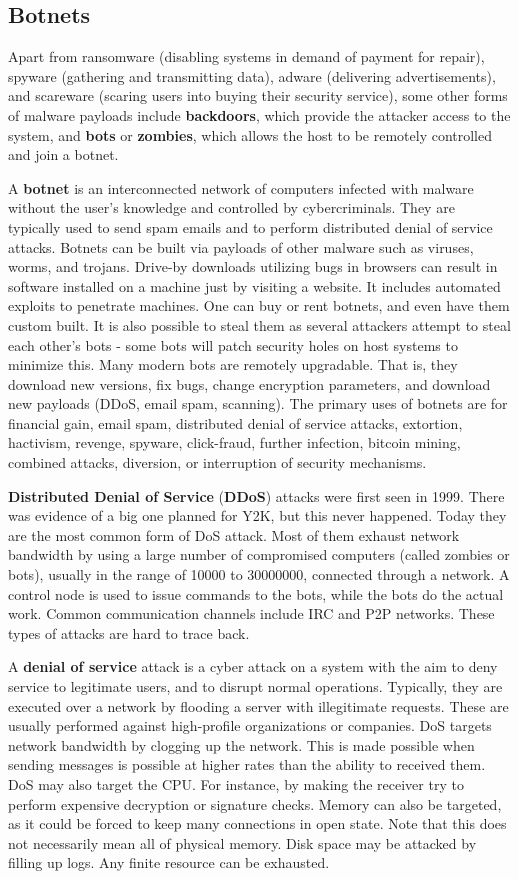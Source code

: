 \documentclass[11pt]{article}
\theoremstyle{plain} %
\theoremstyle{definition}
\theoremstyle{example}
\theoremstyle{remark}
\begin{document}
\subsection{Botnets}
Apart from ransomware (disabling systems in demand of payment for repair), spyware (gathering and transmitting data), adware (delivering advertisements), and scareware (scaring users into buying their security service), some other forms of malware payloads include \textbf{backdoors}, which provide the attacker access to the system, and \textbf{bots} or \textbf{zombies}, which allows the host to be remotely controlled and join a botnet. 

A \textbf{botnet} is an interconnected network of computers infected with malware without the user's knowledge and controlled by cybercriminals. They are typically used to send spam emails and to perform distributed denial of service attacks. Botnets can be built via payloads of other malware such as viruses, worms, and trojans. Drive-by downloads utilizing bugs in browsers can result in software installed on a machine just by visiting a website. It includes automated exploits to penetrate machines. One can buy or rent botnets, and even have them custom built. It is also possible to steal them as several attackers attempt to steal each other's bots - some bots will patch security holes on host systems to minimize this. Many modern bots are remotely upgradable. That is, they download new versions, fix bugs, change encryption parameters, and download new payloads (DDoS, email spam, scanning). The primary uses of botnets are for financial gain, email spam, distributed denial of service attacks, extortion, hactivism, revenge, spyware, click-fraud, further infection, bitcoin mining, combined attacks, diversion, or interruption of security mechanisms. 

\textbf{Distributed Denial of Service} (\textbf{DDoS}) attacks were first seen in 1999. There was evidence of a big one planned for Y2K, but this never happened. Today they are the most common form of DoS attack. Most of them exhaust network bandwidth by using a large number of compromised computers (called zombies or bots), usually in the range of 10000 to 30000000, connected through a network. A control node is used to issue commands to the bots, while the bots do the actual work. Common communication channels include IRC and P2P networks. These types of attacks are hard to trace back.

A \textbf{denial of service} attack is a cyber attack on a system with the aim to deny service to legitimate users, and to disrupt normal operations. Typically, they are executed over a network by flooding a server with illegitimate requests. These are usually performed against high-profile organizations or companies. DoS targets network bandwidth by clogging up the network. This is made possible when sending messages is possible at higher rates than the ability to received them. DoS may also target the CPU. For instance, by making the receiver try to perform expensive decryption or signature checks. Memory can also be targeted, as it could be forced to keep many connections in open state. Note that this does not necessarily mean all of physical memory. Disk space may be attacked by filling up logs. Any finite resource can be exhausted.
\end{document}
